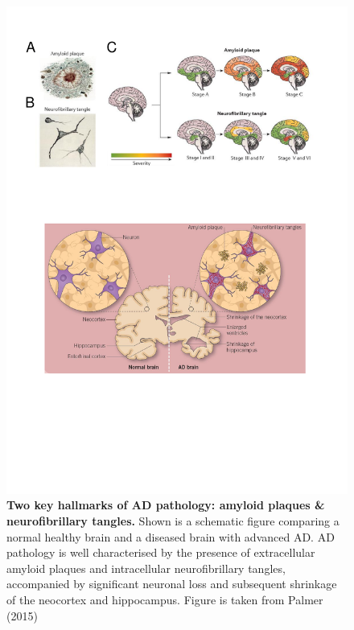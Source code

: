 \vspace{0.5cm}
\begin{figure}[!ht]
	\centering
	\includegraphics[page=1,trim={0 7cm 1cm 13cm},clip, scale = 0.75]{Figures/Introduction_Figures.pdf}
	\captionsetup{width=0.95\textwidth,singlelinecheck=off}
	\caption[Two key hallmarks of AD pathology: amyloid plaques \& neurofibrillary tangles]%
	{\textbf{Two key hallmarks of AD pathology: amyloid plaques \& neurofibrillary tangles.} Shown is a schematic figure comparing a normal healthy brain and a diseased brain with advanced AD. AD pathology is well characterised by the presence of extracellular amyloid plaques and intracellular neurofibrillary tangles, accompanied by significant neuronal loss and subsequent shrinkage of the neocortex and hippocampus. Figure is taken from Palmer (2015)\cite{AlanM.Palmer2015}
	}
	\label{fig:AD_intro}
\end{figure} 

